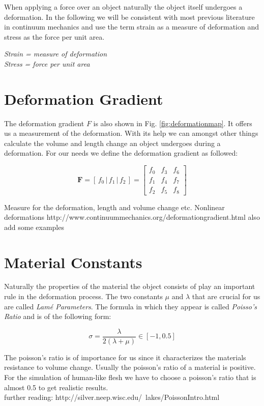 When applying a force over an object naturally the object itself undergoes a deformation. In the following we will be consistent with most previous literature in continuum mechanics and use the term strain as a measure of deformation and stress as the force per unit area.

\begin{addmargin}[2cm]{2cm}
\textit{Strain = measure of deformation}  \\
\textit{Stress = force per unit area} 
\end{addmargin}


\section{Deformation Gradient}

The deformation gradient $F$ is also shown in Fig. \ref{fig:deformationmap}. It offers us a measurement of the deformation. With its help we can amongst other things calculate the volume and length change an object undergoes during a deformation.
For our needs we define the deformation gradient as followed:

\[
\textbf{F} = \left[ \,f_0\, \bigg| \,f_1\, \bigg| \,f_2\, \right] = \begin{bmatrix} f_0 & f_3 & f_6 \\ f_1 & f_4 & f_7 \\ f_2 & f_5 & f_8 \end{bmatrix}
\]


Measure for the deformation, length and volume change etc.
Nonlinear deformations
http://www.continuummechanics.org/deformationgradient.html
also add some examples

\section{Material Constants}

Naturally the properties of the material the object consists of play an important rule in the deformation process. The two constants $\mu$ and $\lambda$ that are crucial for us are called \textit{Lamé Parameters}. The formula in which they appear is called \textit{Poisso's Ratio} and is of the following form:

\[ \sigma =  \frac{\lambda}{2(\lambda + \mu)} \in [-1, 0.5] \]

The poisson's ratio is of importance for us since it characterizes the materials resistance to volume change. Usually the poisson's ratio of a material is positive.
\\
For the simulation of human-like flesh we have to choose a poisson's ratio that is almost 0.5 to get realistic results.
\\ further reading: http://silver.neep.wisc.edu/~lakes/PoissonIntro.html


